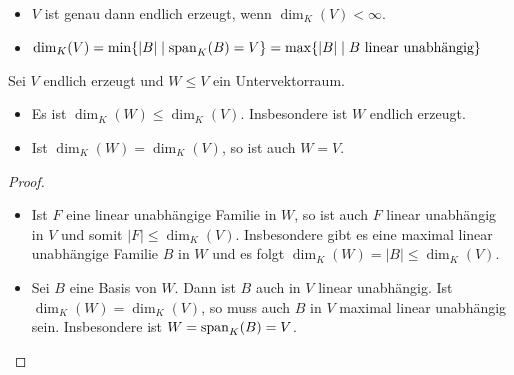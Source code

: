 \begin{remark}
	\begin{itemize}
		\item $V$ ist genau dann endlich erzeugt, wenn $\dim_K(V)< \infty$.
		\item $\dim_K(V)=\min\{|B| \mid \operatorname{span}_K(B)=V\}=\max\{|B| \mid B\text{ linear unabhängig}\}$
	\end{itemize}
\end{remark}

\begin{proposition}
	Sei $V$ endlich erzeugt und $W\le V$ ein Untervektorraum.
	\begin{itemize}
		\item Es ist $\dim_K(W)\le \dim_K(V)$. Insbesondere ist $W$ endlich erzeugt.
		\item Ist $\dim_K(W)=\dim_K(V)$, so ist auch $W=V$.
	\end{itemize}
\end{proposition}
\begin{proof}
	\begin{itemize}
		\item Ist $F$ eine linear unabhängige Familie in $W$, so ist auch $F$ linear unabhängig in $V$ und somit $|F|\le 
		\dim_K(V)$. Insbesondere gibt es eine maximal linear unabhängige Familie $B$ in $W$ und es folgt $\dim_K(W)=|B|
		\le \dim_K(V)$.
		\item Sei $B$ eine Basis von $W$. Dann ist $B$ auch in $V$ linear unabhängig. Ist $\dim_K(W)=\dim_K(V)$, so muss 
		auch $B$ in $V$ maximal linear unabhängig sein. Insbesondere ist $W=\operatorname{span}_K(B)=V$.
	\end{itemize}
\end{proof}
